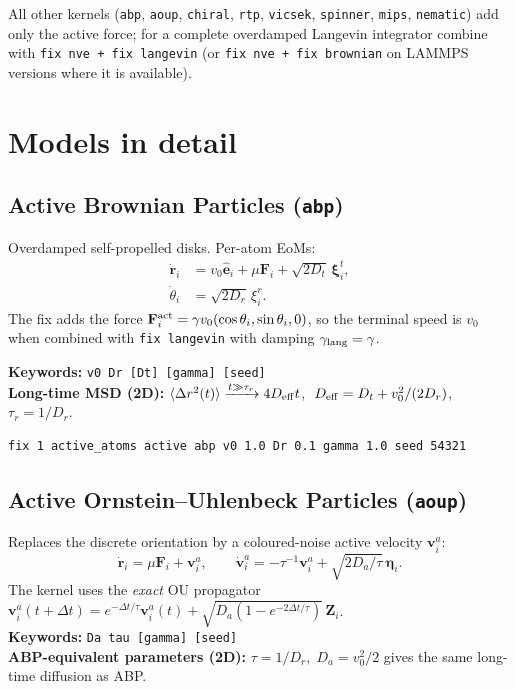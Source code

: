 \documentclass[11pt,a4paper]{article}
\begin{document}
\noindent
All other kernels (\texttt{abp}, \texttt{aoup}, \texttt{chiral}, \texttt{rtp},
\texttt{vicsek}, \texttt{spinner}, \texttt{mips}, \texttt{nematic}) add only
the active force; for a complete overdamped Langevin integrator combine
with \texttt{fix nve + fix langevin} (or \texttt{fix nve + fix brownian} on
LAMMPS versions where it is available).

\section{Models in detail}

\subsection{Active Brownian Particles (\texttt{abp})}
Overdamped self-propelled disks.  Per-atom EoMs:
\begin{align*}
\dot{\mathbf r}_i &= v_0\hat{\mathbf e}_i + \mu \mathbf F_i + \sqrt{2D_t}\,\boldsymbol\xi_i^{t}, \\
\dot\theta_i &= \sqrt{2D_r}\,\xi_i^{r}.
\end{align*}
The fix adds the force $\mathbf F_i^{\rm act} = \gamma v_0(\cos\theta_i,\sin\theta_i,0)$,
so the terminal speed is $v_0$ when combined with \texttt{fix langevin}
with damping $\gamma_{\rm lang}=\gamma$.

\noindent
\textbf{Keywords:} \texttt{v0 Dr [Dt] [gamma] [seed]}\\
\textbf{Long-time MSD (2D):}\quad
$\langle\Delta r^2(t)\rangle\xrightarrow{t\gg\tau_r} 4D_{\rm eff}t$,
$\;D_{\rm eff}=D_t+v_0^2/(2D_r)$,\; $\tau_r=1/D_r$.

\begin{lstlisting}
fix 1 active_atoms active abp v0 1.0 Dr 0.1 gamma 1.0 seed 54321
\end{lstlisting}

\subsection{Active Ornstein--Uhlenbeck Particles (\texttt{aoup})}
Replaces the discrete orientation by a coloured-noise active velocity
$\mathbf v_i^{a}$:
\[
\dot{\mathbf r}_i = \mu\mathbf F_i + \mathbf v_i^{a},\qquad
\dot{\mathbf v}_i^{a} = -\tau^{-1}\mathbf v_i^{a} + \sqrt{2D_a/\tau}\,\boldsymbol\eta_i .
\]
The kernel uses the \emph{exact} OU propagator
$\mathbf v_i^{a}(t+\Delta t)=e^{-\Delta t/\tau}\mathbf v_i^{a}(t)
+\sqrt{D_a(1-e^{-2\Delta t/\tau})}\,\mathbf Z_i$.\\
\textbf{Keywords:} \texttt{Da tau [gamma] [seed]}\\
\textbf{ABP-equivalent parameters (2D):}\quad
$\tau=1/D_r,\;D_a=v_0^2/2$ gives the same long-time diffusion as ABP.
\end{document}
